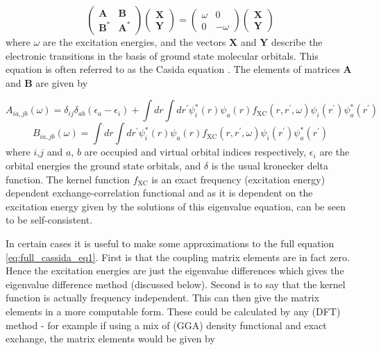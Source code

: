 \begin{equation}
\label{eq:full_cassida_eq1}
\left(\begin{matrix}
\mathbf{A} & \mathbf{B} \\
\mathbf{B^*} & \mathbf{A^*}
\end{matrix}\right)
\left(\begin{matrix}
\mathbf{X}\\
\mathbf{Y}
\end{matrix}\right)
=
\left(\begin{matrix}
\omega & 0\\
0 & -\omega
\end{matrix}\right)
\left(\begin{matrix}
\mathbf{X}\\
\mathbf{Y}
\end{matrix}\right)
\end{equation}
%
where $\omega$ are the excitation energies, and the vectors $\mathbf{X}$ and $\mathbf{Y}$ 
describe the electronic transitions in the basis of ground state molecular orbitals.
This equation is often referred to as the Casida equation \cite{Casida1995}. The
elements of matrices $\mathbf{A}$ and $\mathbf{B}$ are given by

\begin{equation}
A_{ia,jb}\left(\omega\right) = \delta_{ij}\delta_{ab}\left(\epsilon_a - \epsilon_i\right) + \int dr \int dr^\prime \psi_i^*\left(r\right) \psi_a\left(r\right) f_{\text{XC}}\left(r, r^\prime, \omega\right) \psi_i\left(r^\prime\right) \psi_a^*\left(r^\prime\right)
\end{equation}
%
\begin{equation}
B_{ia,jb}\left(\omega\right) = \int dr \int dr^\prime \psi_i^*\left(r\right) \psi_a\left(r\right) f_{\text{XC}}\left(r, r^\prime, \omega\right) \psi_i\left(r^\prime\right) \psi_a^*\left(r^\prime\right)
\end{equation}
%
where $i$,$j$ and $a$, $b$ are occupied and virtual orbital indices respectively, $\epsilon_i$
are the orbital energies the ground state orbitals, and $\delta$ is the usual kronecker 
delta function. The kernel function $f_{\text{XC}}$ is an exact frequency (excitation energy) 
dependent exchange-correlation functional and as it is dependent on the excitation 
energy given by the solutions of this eigenvalue equation, can be seen to be self-consistent.

In certain cases it is useful to make some approximations to the full equation \ref{eq:full_cassida_eq1}. 
First is that the coupling matrix elements are in fact zero. Hence the excitation 
energies are just the eigenvalue differences which gives the eigenvalue difference 
method (discussed below). Second is to say that the kernel function is actually
frequency independent. This can then give the matrix elements in a more computable
form. These could be calculated by any (DFT) method - for example if using a mix
of (GGA) density functional and exact exchange, the matrix elements would be given 
by

